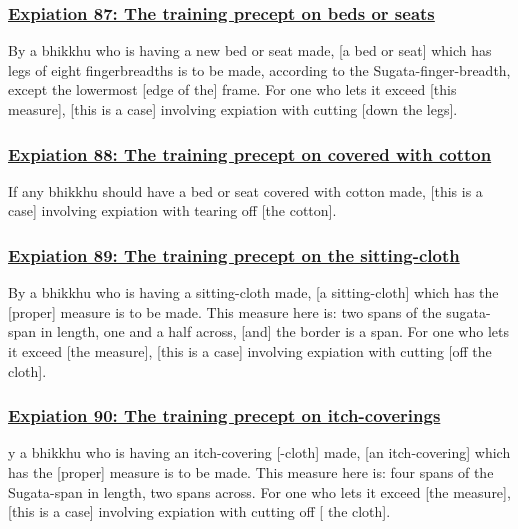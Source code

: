 \subsubsection*{\hyperref[pac87]{Expiation 87: The training precept on beds or seats}}
\label{exp87}
By a bhikkhu who is having a new bed or seat made, [a bed or seat] which has legs of eight fingerbreadths is to be made, according to the Sugata-finger-breadth, except the lowermost [edge of the] frame. For one who lets it exceed [this measure], [this is a case] involving expiation with cutting [down the legs].



\subsubsection*{\hyperref[pac88]{Expiation 88: The training precept on covered with cotton}}
\label{exp88}
If any bhikkhu should have a bed or seat covered with cotton made, [this is a case] involving expiation with tearing off [the cotton].



\subsubsection*{\hyperref[pac89]{Expiation 89: The training precept on the sitting-cloth}}
\label{exp89}
By a bhikkhu who is having a sitting-cloth made, [a sitting-cloth] which has the [proper] measure is to be made. This measure here is: two spans of the sugata-span in length, one and a half across, [and] the border is a span. For one who lets it exceed [the measure], [this is a case] involving expiation with cutting [off the cloth].



\subsubsection*{\hyperref[pac90]{Expiation 90: The training precept on itch-coverings}}
\label{exp90}
y a bhikkhu who is having an itch-covering [-cloth] made, [an itch-covering] which has the [proper] measure is to be made. This measure here is: four spans of the Sugata-span in length, two spans across. For one who lets it exceed [the measure], [this is a case] involving expiation with cutting off [ the cloth].



